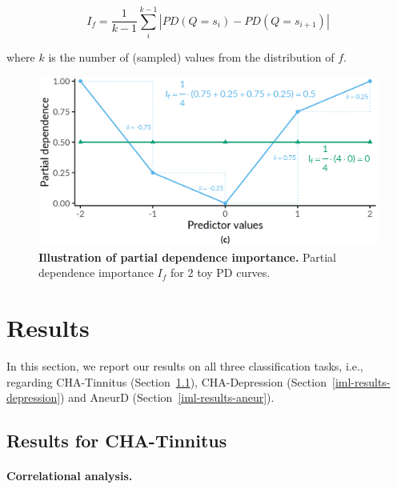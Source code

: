 \documentclass[
  oneside]{book}
\begin{document}
\begin{equation}
I_f = \frac{1}{k-1}\sum_{i}^{k-1} |PD(Q=s_i) - PD(Q=s_{i+1})|
\label{eq:pdp-imp}
\end{equation}

where \(k\) is the number of (sampled) values from the distribution of \(f\).



\begin{figure}[htbp]

{\centering \includegraphics[width=0.64\linewidth]{figures/09-pd-intro-2} 

}

\caption{\textbf{Illustration of partial dependence importance.} Partial dependence importance \(I_f\) for 2 toy PD curves.}\label{fig:09-pd-intro-2}
\end{figure}

\hypertarget{iml-results}{%
\section{Results}\label{iml-results}}

In this section, we report our results on all three classification tasks, i.e., regarding CHA-Tinnitus (Section~\ref{iml-results-tinnitus}),
CHA-Depression (Section~\ref{iml-results-depression}) and
AneurD (Section~\ref{iml-results-aneur}).

\hypertarget{iml-results-tinnitus}{%
\subsection{Results for CHA-Tinnitus}\label{iml-results-tinnitus}}

\paragraph*{Correlational analysis.}
\end{document}
